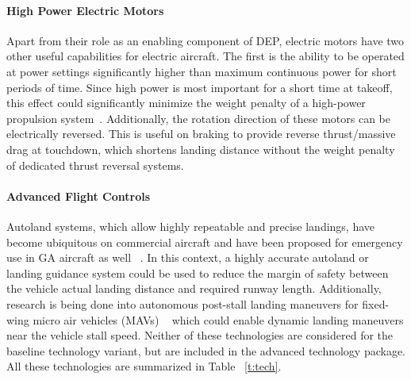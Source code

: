 \documentclass[]{aiaa-tc}%
\begin{document}
\paragraph{High Power Electric Motors}
Apart from their role as an enabling component of DEP, electric motors have two other useful capabilities for electric aircraft.  The first is the ability to be operated at power settings significantly higher than maximum continuous power for short periods of time.  Since high power is most important for a short time at takeoff, this effect could significantly minimize the weight penalty of a high-power propulsion system~\cite{Moore_Mis}. Additionally, the rotation direction of these motors can be electrically reversed.  This is useful on braking to provide reverse thrust/massive drag at touchdown, which shortens landing distance without the weight penalty of dedicated thrust reversal systems.  

\paragraph{Advanced Flight Controls}
Autoland systems, which allow highly repeatable and precise landings, have become ubiquitous on commercial aircraft and have been proposed for emergency use in GA aircraft as well ~\cite{Siegel2012}.  In this context, a highly accurate autoland or landing guidance system could be used to reduce the margin of safety between the vehicle actual landing distance and required runway length.  Additionally, research is being done into autonomous post-stall landing maneuvers for fixed-wing micro air vehicles (MAVs) ~\cite{Moore_Perch} which could enable dynamic landing maneuvers near the vehicle stall speed.  Neither of these technologies are considered for the baseline technology variant, but are included in the advanced technology package.  All these technologies are summarized in Table ~\ref{t:tech}. 
\end{document}
